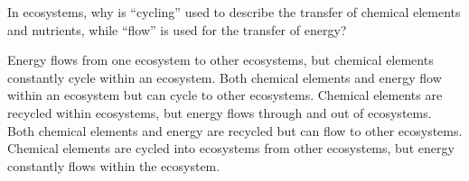 \newpage

\question
In ecosystems, why is ``cycling'' used to describe the transfer of chemical elements and nutrients, while ``flow'' is used for the transfer of energy?

\begin{choices}
\choice Energy flows from one ecosystem to other ecosystems, but chemical elements constantly cycle within an ecosystem.
\choice Both chemical elements and energy flow within an ecosystem but can cycle to other ecosystems.
\correctchoice Chemical elements are recycled within ecosystems, but energy flows through and out of ecosystems.
\choice Both chemical elements and energy are recycled but can flow to other ecosystems.
\choice Chemical elements are cycled into ecosystems from other ecosystems, but energy constantly flows within the ecosystem.
\end{choices}

